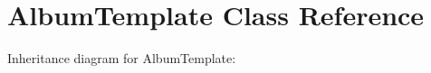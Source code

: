 \hypertarget{classAlbumTemplate}{}\section{Album\+Template Class Reference}
\label{classAlbumTemplate}


Inheritance diagram for Album\+Template\+:
